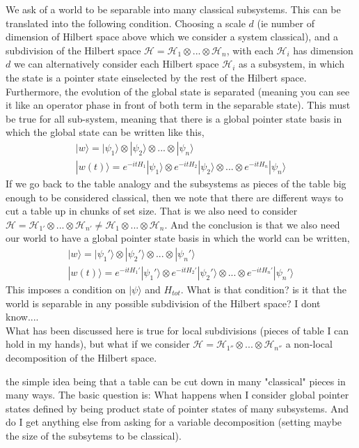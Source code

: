 \documentclass{article}
\begin{document}
We ask of a world to be separable into many classical subsystems. This can be translated into the following condition. Choosing a scale $d$ (ie number of dimension of Hilbert space above which we consider a system classical), and a subdivision of the Hilbert space $\mathcal{H}=\mathcal{H}_1\otimes ...\otimes \mathcal{H}_n$, with each $\mathcal{H}_i$ has dimension $d$ we can alternatively consider each Hilbert space $\mathcal{H}_i$ as a subsystem, in which the state is a pointer state einselected by the rest of the Hilbert space. Furthermore, the evolution of the global state is separated (meaning you can see it like an operator phase in front of both term in the separable state). This must be true for all sub-system, meaning that there is a global pointer state basis in which the global state can be written like this, 
\begin{align}
    |w\rangle=|\psi_1\rangle\otimes|\psi_2\rangle\otimes...\otimes|\psi_n\rangle\\
    |w(t)\rangle=e^{-itH_1}|\psi_1\rangle\otimes e^{-itH_2}|\psi_2\rangle\otimes...\otimes e^{-itH_n}|\psi_n\rangle
\end{align}
If we go back to the table analogy and the subsystems as pieces of the table big enough to be considered classical, then we note that there are different ways to cut a table up in chunks of set size. That is we also need to consider $\mathcal{H}=\mathcal{H}_{1'}\otimes ...\otimes \mathcal{H}_{n'}\neq\mathcal{H}_1\otimes ...\otimes \mathcal{H}_n$. And the conclusion is that we also need our world to have a global pointer state basis in which the world can be written,
\begin{align}
    |w\rangle=|\psi_1'\rangle\otimes|\psi_2'\rangle\otimes...\otimes|\psi_n'\rangle\\
    |w(t)\rangle=e^{-itH_1'}|\psi_1'\rangle\otimes e^{-itH_2'}|\psi_2'\rangle\otimes...\otimes e^{-itH_n'}|\psi_n'\rangle
\end{align}
This imposes a condition on $|\psi\rangle$ and $H_{tot}$. What is that condition? is it that the world is separable in any possible subdivision of the Hilbert space? I dont know....\\

What has been discussed here is true for local subdivisions (pieces of table I can hold in my hands), but what if we consider $\mathcal{H}=\mathcal{H}_{1''}\otimes ...\otimes \mathcal{H}_{n''}$ a non-local decomposition of the Hilbert space.     

the simple idea being that a table can be cut down in many "classical" pieces in many ways. The basic question is: What happens when I consider global pointer states defined by being product state of pointer states of many subsystems. And do I get anything else from asking for a variable decomposition (setting maybe the size of the subsytems to be classical). 
\end{document}
